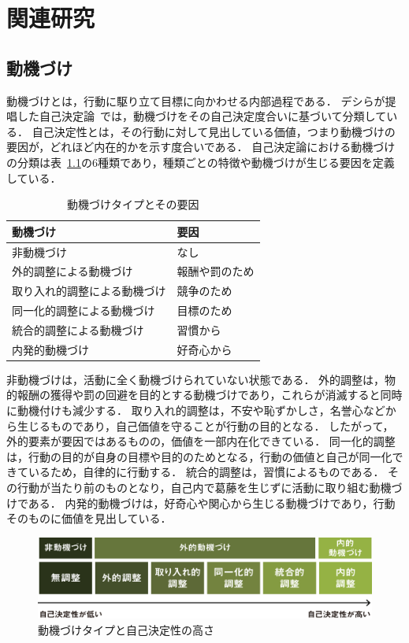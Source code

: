 \chapter{関連研究}

\section{動機づけ}
動機づけとは，行動に駆り立て目標に向かわせる内部過程である．
デシらが提唱した自己決定論~\cite{ryan2000self}では，動機づけをその自己決定度合いに基づいて分類している．
自己決定性とは，その行動に対して見出している価値，つまり動機づけの要因が，どれほど内在的かを示す度合いである．
自己決定論における動機づけの分類は表~\ref{tb:motivation}の6種類であり，種類ごとの特徴や動機づけが生じる要因を定義している．

\begin{table}[htb]
\begin{center}
  \begin{tabular}{|l|l|} \hline
    動機づけ & 要因 \\ \hline
    非動機づけ & なし \\
    外的調整による動機づけ & 報酬や罰のため \\
    取り入れ的調整による動機づけ & 競争のため \\ 
    同一化的調整による動機づけ & 目標のため \\ 
    統合的調整による動機づけ & 習慣から \\ 
	内発的動機づけ & 好奇心から \\ \hline
  \end{tabular}
  \caption{動機づけタイプとその要因}
  \label{tb:motivation}
\end{center}
\end{table}

非動機づけは，活動に全く動機づけられていない状態である．
外的調整は，物的報酬の獲得や罰の回避を目的とする動機づけであり，これらが消滅すると同時に動機付けも減少する．
取り入れ的調整は，不安や恥ずかしさ，名誉心などから生じるものであり，自己価値を守ることが行動の目的となる．
したがって，外的要素が要因ではあるものの，価値を一部内在化できている．
同一化的調整は，行動の目的が自身の目標や目的のためとなる，行動の価値と自己が同一化できているため，自律的に行動する．
統合的調整は，習慣によるものである．
その行動が当たり前のものとなり，自己内で葛藤を生じずに活動に取り組む動機づけである．
内発的動機づけは，好奇心や関心から生じる動機づけであり，行動そのものに価値を見出している．

\begin{figure}[ht]
	\begin{center}
	\includegraphics[width=12cm]{images/2/motivation.eps}
	\caption{動機づけタイプと自己決定性の高さ}
	\label{fig:motivation}
	\end{center}
\end{figure}

